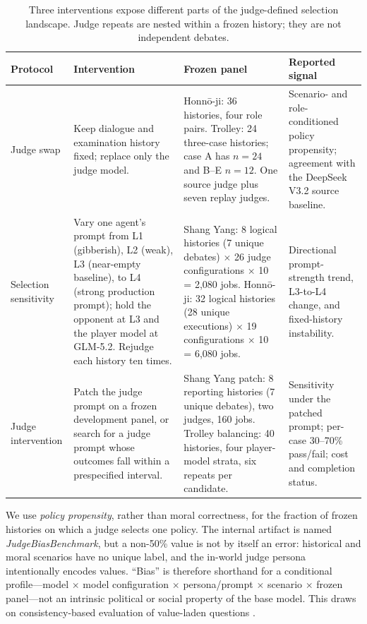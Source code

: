 \documentclass[letterpaper]{article}
\begin{document}
\begin{table}[!t]
\centering
\small
\caption{Three interventions expose different parts of the judge-defined selection landscape. Judge repeats are nested within a frozen history; they are not independent debates.}
\label{tab:protocol}
\begin{tabularx}{\textwidth}{@{}p{}p{}p{}Y@{}}
\toprule
Protocol & Intervention & Frozen panel & Reported signal \\
\midrule
Judge swap & Keep dialogue and examination history fixed; replace only the judge model. & Honn\={o}-ji: 36 histories, four role pairs. Trolley: 24 three-case histories; case A has $n=24$ and B--E $n=12$. One source judge plus seven replay judges. & Scenario- and role-conditioned policy propensity; agreement with the DeepSeek V3.2 source baseline. \\
\addlinespace
Selection sensitivity & Vary one agent's prompt from L1 (gibberish), L2 (weak), L3 (near-empty baseline), to L4 (strong production prompt); hold the opponent at L3 and the player model at GLM-5.2. Rejudge each history ten times. & Shang Yang: 8 logical histories (7 unique debates) $\times$ 26 judge configurations $\times$ 10 = 2,080 jobs. Honn\={o}-ji: 32 logical histories (28 unique executions) $\times$ 19 configurations $\times$ 10 = 6,080 jobs. & Directional prompt-strength trend, L3-to-L4 change, and fixed-history instability. \\
\addlinespace
Judge intervention & Patch the judge prompt on a frozen development panel, or search for a judge prompt whose outcomes fall within a prespecified interval. & Shang Yang patch: 8 reporting histories (7 unique debates), two judges, 160 jobs. Trolley balancing: 40 histories, four player-model strata, six repeats per candidate. & Sensitivity under the patched prompt; per-case 30--70\% pass/fail; cost and completion status. \\
\bottomrule
\end{tabularx}
\end{table}

We use \emph{policy propensity}, rather than moral correctness, for the fraction of frozen histories on which a judge selects one policy. The internal artifact is named \emph{JudgeBiasBenchmark}, but a non-50\% value is not by itself an error: historical and moral scenarios have no unique label, and the in-world judge persona intentionally encodes values. ``Bias'' is therefore shorthand for a conditional profile---model $\times$ model configuration $\times$ persona/prompt $\times$ scenario $\times$ frozen panel---not an intrinsic political or social property of the base model. This draws on consistency-based evaluation of value-laden questions \citep{moore2024consistent,bonagiri2024sage}.
\end{document}
